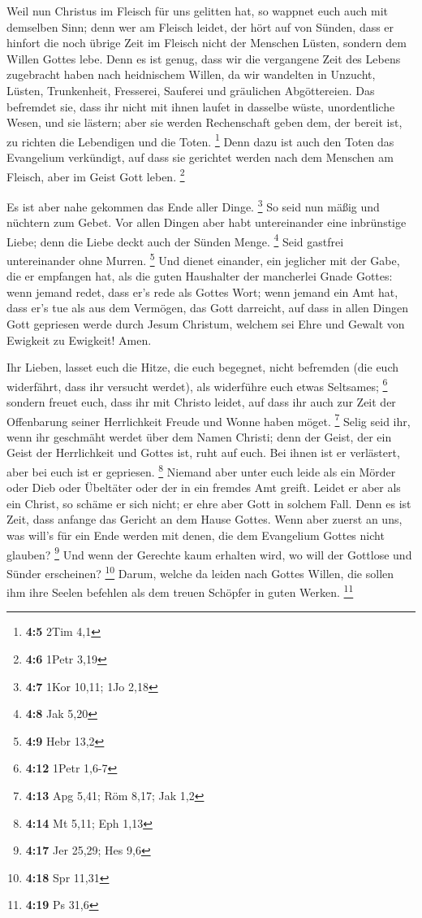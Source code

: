  Weil nun Christus im Fleisch für uns gelitten hat, so
wappnet euch auch mit demselben Sinn; denn wer am Fleisch leidet, der
hört auf von Sünden,  dass er hinfort die noch übrige Zeit
im Fleisch nicht der Menschen Lüsten, sondern dem Willen Gottes lebe.
 Denn es ist genug, dass wir die vergangene Zeit des Lebens
zugebracht haben nach heidnischem Willen, da wir wandelten in Unzucht,
Lüsten, Trunkenheit, Fresserei, Sauferei und gräulichen Abgöttereien.
 Das befremdet sie, dass ihr nicht mit ihnen laufet in
dasselbe wüste, unordentliche Wesen, und sie lästern;  aber
sie werden Rechenschaft geben dem, der bereit ist, zu richten die
Lebendigen und die Toten. \footnote{\textbf{4:5} 2Tim 4,1} 
Denn dazu ist auch den Toten das Evangelium verkündigt, auf dass sie
gerichtet werden nach dem Menschen am Fleisch, aber im Geist Gott leben.
\footnote{\textbf{4:6} 1Petr 3,19}

 Es ist aber nahe gekommen das Ende aller Dinge. \footnote{\textbf{4:7}
  1Kor 10,11; 1Jo 2,18}  So seid nun mäßig und nüchtern zum
Gebet. Vor allen Dingen aber habt untereinander eine inbrünstige Liebe;
denn die Liebe deckt auch der Sünden Menge. \footnote{\textbf{4:8} Jak
  5,20}  Seid gastfrei untereinander ohne Murren.
\footnote{\textbf{4:9} Hebr 13,2}  Und dienet einander, ein
jeglicher mit der Gabe, die er empfangen hat, als die guten Haushalter
der mancherlei Gnade Gottes:  wenn jemand redet, dass er's
rede als Gottes Wort; wenn jemand ein Amt hat, dass er's tue als aus dem
Vermögen, das Gott darreicht, auf dass in allen Dingen Gott gepriesen
werde durch Jesum Christum, welchem sei Ehre und Gewalt von Ewigkeit zu
Ewigkeit! Amen.

 Ihr Lieben, lasset euch die Hitze, die euch begegnet,
nicht befremden (die euch widerfährt, dass ihr versucht werdet), als
widerführe euch etwas Seltsames; \footnote{\textbf{4:12} 1Petr 1,6-7}
 sondern freuet euch, dass ihr mit Christo leidet, auf dass
ihr auch zur Zeit der Offenbarung seiner Herrlichkeit Freude und Wonne
haben möget. \footnote{\textbf{4:13} Apg 5,41; Röm 8,17; Jak 1,2}
 Selig seid ihr, wenn ihr geschmäht werdet über dem Namen
Christi; denn der Geist, der ein Geist der Herrlichkeit und Gottes ist,
ruht auf euch. Bei ihnen ist er verlästert, aber bei euch ist er
gepriesen. \footnote{\textbf{4:14} Mt 5,11; Eph 1,13} 
Niemand aber unter euch leide als ein Mörder oder Dieb oder Übeltäter
oder der in ein fremdes Amt greift.  Leidet er aber als ein
Christ, so schäme er sich nicht; er ehre aber Gott in solchem Fall.
 Denn es ist Zeit, dass anfange das Gericht an dem Hause
Gottes. Wenn aber zuerst an uns, was will's für ein Ende werden mit
denen, die dem Evangelium Gottes nicht glauben? \footnote{\textbf{4:17}
  Jer 25,29; Hes 9,6}  Und wenn der Gerechte kaum erhalten
wird, wo will der Gottlose und Sünder erscheinen? \footnote{\textbf{4:18}
  Spr 11,31}  Darum, welche da leiden nach Gottes Willen,
die sollen ihm ihre Seelen befehlen als dem treuen Schöpfer in guten
Werken. \footnote{\textbf{4:19} Ps 31,6}


